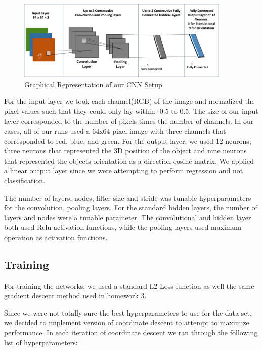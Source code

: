 \documentclass[journal]{IEEEtran}
\begin{document}
\begin{figure}
	\centering\hspace{0 ex}
	\includegraphics[width=4in]{CNN_ARCH}
	\caption{Graphical Representation of our CNN Setup}
	\label{Fig:CNN_ARCH}
\end{figure}

For the input layer we took each channel(RGB) of the image and normalized the pixel values such that they could only lay within -0.5 to 0.5. The size of our input layer corresponded to the number of pixels times the number of channels. In our cases, all of our runs used a 64x64 pixel image with three channels that corresponded to red, blue, and green. For the output layer, we used 12 neurons; three neurons that represented the 3D position of the object and nine neurons that represented the objects orientation as a direction cosine matrix. We applied a linear output layer since we were attempting to perform regression and not classification. 

The number of layers, nodes, filter size and stride was tunable hyperparameters for the convolution, pooling layers. For the standard hidden layers, the number of layers and nodes were a tunable parameter. The convolutional and hidden layer both used Relu activation functions, while the pooling layers used maximum operation as activation functions. 



\subsection{Training}
For training the networks, we used a standard L2 Loss function as well the same gradient descent method used in homework 3. 

Since we were not totally sure the best hyperparameters to use for the data set, we decided to implement version of coordinate descent to attempt to maximize performance. 
In each iteration of coordinate descent we ran through the following list of hyperparameters:
\end{document}
